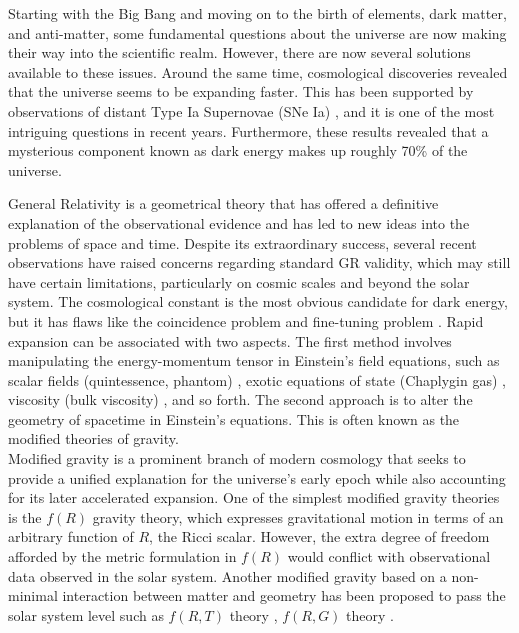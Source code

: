Starting with the Big Bang and moving on to the birth of elements, dark matter, and anti-matter, some fundamental questions about the universe are now making their way into the scientific realm. However, there are now several solutions available to these issues. Around the same time, cosmological discoveries revealed that the universe seems to be expanding faster. This has been supported by observations of distant Type Ia Supernovae (SNe Ia) \cite{Riess,Perlmutter}, and it is one of the most intriguing questions in recent years. Furthermore, these results revealed that a mysterious component known as dark energy makes up roughly 70\% of the universe. 

General Relativity is a geometrical theory that has offered a definitive explanation of the observational evidence and has led to new ideas into the problems of space and time. Despite its extraordinary success, several recent observations have raised concerns regarding standard GR validity, which may still have certain limitations, particularly on cosmic scales and beyond the solar system.
The cosmological constant is the most obvious candidate for dark energy, but it has flaws like the coincidence problem and fine-tuning problem \cite{Copeland,Bull,Weinberg}. Rapid expansion can be associated with two aspects. The first method involves manipulating the energy-momentum tensor in Einstein's field equations, such as scalar fields (quintessence, phantom) \cite{Wang,Shinji,Caldwell}, exotic equations of state (Chaplygin gas) \cite{Bento,Alexander}, viscosity (bulk viscosity) \cite{Padmanabhan,Brevik}, and so forth. The second approach is to alter the geometry of spacetime in  Einstein's equations. This is often known as the modified theories of gravity.\\
Modified gravity is a prominent branch of modern cosmology that seeks to provide a unified explanation for the universe's early epoch while also accounting for its later accelerated expansion. One of the simplest modified gravity theories is the $f(R)$ \cite{Starobinsky,Buchdahl,Martino} gravity theory, which expresses gravitational motion in terms of an arbitrary function of $R$, the Ricci scalar.
However, the extra degree of freedom afforded by the metric formulation in $f(R)$ would conflict with observational data observed in the solar system. Another modified gravity based on a non-minimal interaction between matter and geometry has been proposed to pass the solar system level such as $f(R,T)$ theory \cite{Xing,Harko/2014,Moraes/2017,Harko/2011}, $f(R,G)$ theory \cite{Elizalde,Bamba/2010}.

